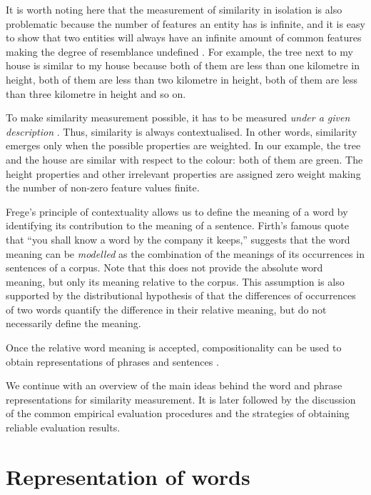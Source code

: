 It is worth noting here that the measurement of similarity in isolation is also problematic because the number of features an entity has is infinite, and it is easy to show that two entities will always have an infinite amount of common features making the degree of resemblance undefined \cite{goodman1972problems,hahn1997concepts}. For example, the tree next to my house is similar to my house because both of them are less than one kilometre in height, both of them are less than two kilometre in height, both of them are less than three kilometre in height and so on.

To make similarity measurement possible, it has to be measured \emph{under a given description} \cite{WCS:WCS1282,medin1993respects,Markman1996}. Thus, similarity is always contextualised. In other words, similarity emerges only when the possible properties are weighted. In our example, the tree and the house are similar with respect to the colour: both of them are green. The height properties and other irrelevant properties are assigned zero weight making the number of non-zero feature values finite.

Frege's principle of contextuality allows us to define the meaning of a word by identifying its contribution to the meaning of a sentence. Firth's \citeyearpar{firth1957lingtheory} famous quote that ``you shall know a word by the company it keeps,'' suggests that the word meaning can be \emph{modelled} as the combination of the meanings of its occurrences in sentences of a corpus. Note that this does not provide the absolute word meaning, but only its meaning relative to the corpus. This assumption is also supported by the distributional hypothesis of  that the differences of occurrences of two words quantify the difference in their relative meaning, but do not necessarily define the meaning.

Once the relative word meaning is accepted, compositionality can be used to obtain representations of phrases and sentences \cite{THEO:THEO373,Dowty1980,sep-montague-semantics,DBLP:journals/corr/abs-1003-4394,baroni2014frege}.

We continue with an overview of the main ideas behind the word and phrase representations for similarity measurement. It is later followed by the discussion of the common empirical evaluation procedures and the strategies of obtaining reliable evaluation results.

\section{Representation of words}
\label{sec:distr-hypoth}

